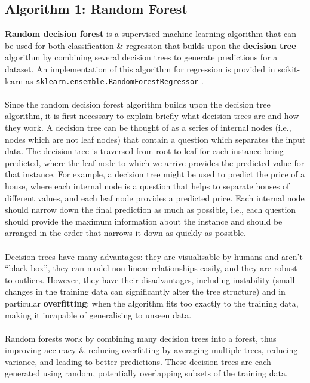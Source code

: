 \documentclass[a4paper, 10pt]{article}
\begin{document}
\subsection{Algorithm 1: Random Forest}
\textbf{Random decision forest} is a supervised machine learning algorithm that can be used for both classification \& regression that builds upon the \textbf{decision tree} algorithm by combining several decision trees to generate predictions for a dataset. An implementation of this algorithm for regression is provided in scikit-learn as \texttt{sklearn.ensemble.RandomForestRegressor} \supercite{scikit_randomforestregressor}.
\\\\
Since the random decision forest algorithm builds upon the decision tree algorithm, it is first necessary to explain briefly what decision trees are and how they work.
A decision tree can be thought of as a series of internal nodes (i.e., nodes which are not leaf nodes) that contain a question which separates the input data.
The decision tree is traversed from root to leaf for each instance being predicted, where the leaf node to which we arrive provides the predicted value for that instance.
For example, a decision tree might be used to predict the price of a house, where each internal node is a question that helps to separate houses of different values, and each leaf node provides a predicted price.
Each internal node should narrow down the final prediction as much as possible, i.e., each question should provide the maximum information about the instance and should be arranged in the order that narrows it down as quickly as possible.
\\\\
Decision trees have many advantages: they are visualisable by humans and aren't ``black-box'', they can model non-linear relationships easily, and they are robust to outliers.
However, they have their disadvantages, including instability (small changes in the training data can significantly alter the tree structure) and in particular \textbf{overfitting}: when the algorithm fits too exactly to the training data, making it incapable of generalising to unseen data.
\\\\
Random forests work by combining many decision trees into a forest, thus improving accuracy \& reducing overfitting by averaging multiple trees, reducing variance, and leading to better predictions.
These decision trees are each generated using random, potentially overlapping subsets of the training data.
\end{document}
